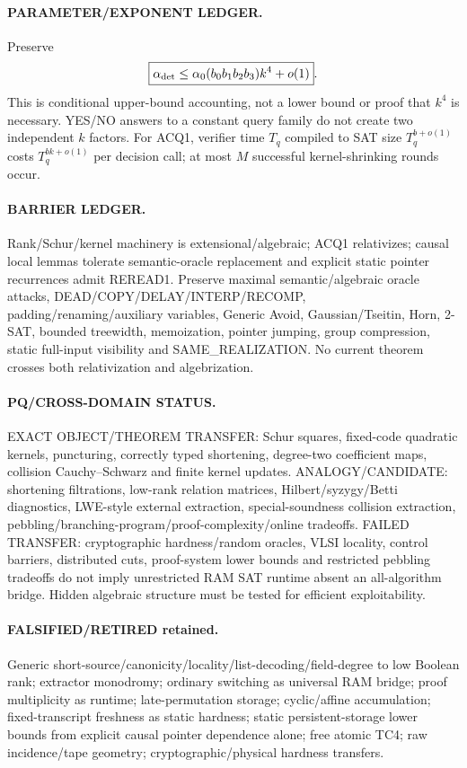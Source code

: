 \documentclass[11pt]{article}
\begin{document}
\paragraph{PARAMETER/EXPONENT LEDGER.} Preserve
\[
\boxed{\alpha_{\rm det}\le\alpha_0(b_0b_1b_2b_3)k^4+o(1)}.
\]
This is conditional upper-bound accounting, not a lower bound or proof that \(k^4\) is necessary. YES/NO answers to a constant query family do not create two independent \(k\) factors. For ACQ1, verifier time \(T_q\) compiled to SAT size \(T_q^{b+o(1)}\) costs \(T_q^{bk+o(1)}\) per decision call; at most \(M\) successful kernel-shrinking rounds occur.

\paragraph{BARRIER LEDGER.} Rank/Schur/kernel machinery is extensional/algebraic; ACQ1 relativizes; causal local lemmas tolerate semantic-oracle replacement and explicit static pointer recurrences admit REREAD1. Preserve maximal semantic/algebraic oracle attacks, DEAD/COPY/DELAY/INTERP/RECOMP, padding/renaming/auxiliary variables, Generic Avoid, Gaussian/Tseitin, Horn, 2-SAT, bounded treewidth, memoization, pointer jumping, group compression, static full-input visibility and SAME_REALIZATION. No current theorem crosses both relativization and algebrization.

\paragraph{PQ/CROSS-DOMAIN STATUS.} EXACT OBJECT/THEOREM TRANSFER: Schur squares, fixed-code quadratic kernels, puncturing, correctly typed shortening, degree-two coefficient maps, collision Cauchy--Schwarz and finite kernel updates. ANALOGY/CANDIDATE: shortening filtrations, low-rank relation matrices, Hilbert/syzygy/Betti diagnostics, LWE-style external extraction, special-soundness collision extraction, pebbling/branching-program/proof-complexity/online tradeoffs. FAILED TRANSFER: cryptographic hardness/random oracles, VLSI locality, control barriers, distributed cuts, proof-system lower bounds and restricted pebbling tradeoffs do not imply unrestricted RAM SAT runtime absent an all-algorithm bridge. Hidden algebraic structure must be tested for efficient exploitability.

\paragraph{FALSIFIED/RETIRED retained.} Generic short-source/canonicity/locality/list-decoding/field-degree to low Boolean rank; extractor monodromy; ordinary switching as universal RAM bridge; proof multiplicity as runtime; late-permutation storage; cyclic/affine accumulation; fixed-transcript freshness as static hardness; static persistent-storage lower bounds from explicit causal pointer dependence alone; free atomic TC4; raw incidence/tape geometry; cryptographic/physical hardness transfers.
\end{document}

